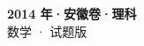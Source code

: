 \documentclass[zihao=-4, a4paper]{ctexart}
\begin{document}
\begin{center}
  {\Large\bfseries 2014 年·安徽卷·理科}\\[4pt]
  {\large 数学 · 试题版}
\end{center}
\medskip
{}

\end{document}
